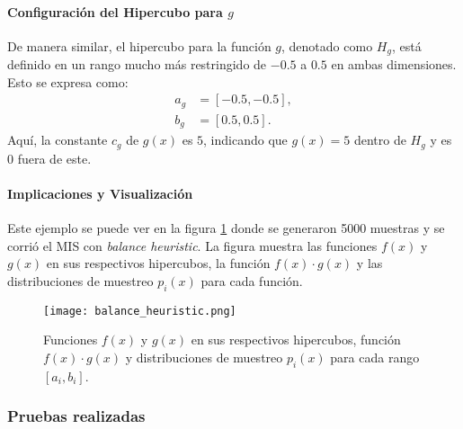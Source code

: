 \documentclass{article}
\begin{document}
\paragraph{Configuración del Hipercubo para \( g \)}
De manera similar, el hipercubo para la función \( g \), denotado como \( H_g \), está definido en un rango mucho más restringido de \(-0.5\) a \(0.5\) en ambas dimensiones. Esto se expresa como:
\begin{align*}
    a_g &= [-0.5, -0.5], \\
    b_g &= [0.5, 0.5].
\end{align*}
Aquí, la constante \( c_g \) de \( g(x) \) es \( 5 \), indicando que \( g(x) = 5 \) dentro de \( H_g \) y es \( 0 \) fuera de este.

\paragraph{Implicaciones y Visualización}
Este ejemplo se puede ver en la figura \ref{fig:mis3} donde se generaron 5000 muestras y se corrió el MIS con \textit{balance heuristic}.
La figura muestra las funciones \( f(x) \) y \( g(x) \) en sus respectivos hipercubos, la función \( f(x) \cdot g(x) \) y las distribuciones de muestreo \( p_{i}(x) \) para cada función.

\begin{figure}[H]
\texttt{[image: balance\_heuristic.png]}
\caption{Funciones \( f(x) \) y \( g(x) \) en sus respectivos hipercubos, función \( f(x) \cdot g(x) \) y distribuciones de muestreo \( p_{i}(x) \) para cada rango \( [a_{i}, b_{i}] \).}
\label{fig:mis3}
\end{figure}

\subsubsection{Pruebas realizadas}
\end{document}
